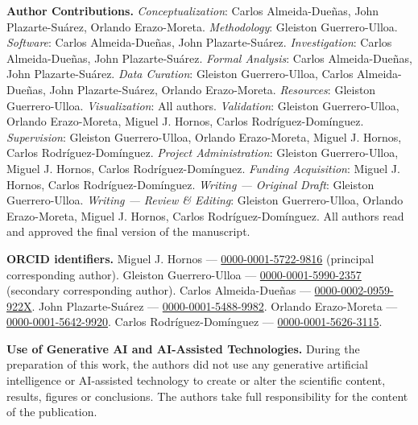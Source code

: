 \documentclass[pdflatex,sn-apa]{sn-jnl}
\begin{document}
    \textbf{Author Contributions.}
        \emph{Conceptualization}: Carlos Almeida-Due\~nas, John Plazarte-Su\'arez, Orlando Erazo-Moreta.
        \emph{Methodology}: Gleiston Guerrero-Ulloa.
        \emph{Software}: Carlos Almeida-Due\~nas, John Plazarte-Su\'arez.
        \emph{Investigation}: Carlos Almeida-Due\~nas, John Plazarte-Su\'arez.
        \emph{Formal Analysis}: Carlos Almeida-Due\~nas, John Plazarte-Su\'arez.
        \emph{Data Curation}: Gleiston Guerrero-Ulloa, Carlos Almeida-Due\~nas, John Plazarte-Su\'arez, Orlando Erazo-Moreta.
        \emph{Resources}: Gleiston Guerrero-Ulloa.
        \emph{Visualization}: All authors.
        \emph{Validation}: Gleiston Guerrero-Ulloa, Orlando Erazo-Moreta, Miguel J. Hornos, Carlos Rodr\'iguez-Dom\'inguez.
        \emph{Supervision}: Gleiston Guerrero-Ulloa, Orlando Erazo-Moreta, Miguel J. Hornos, Carlos Rodr\'iguez-Dom\'inguez.
        \emph{Project Administration}: Gleiston Guerrero-Ulloa, Miguel J. Hornos, Carlos Rodr\'iguez-Dom\'inguez.
        \emph{Funding Acquisition}: Miguel J. Hornos, Carlos Rodr\'iguez-Dom\'inguez.
        \emph{Writing --- Original Draft}: Gleiston Guerrero-Ulloa.
        \emph{Writing --- Review \& Editing}: Gleiston Guerrero-Ulloa, Orlando Erazo-Moreta, Miguel J. Hornos, Carlos Rodr\'iguez-Dom\'inguez.
        All authors read and approved the final version of the manuscript.

        \noindent \textbf{ORCID identifiers.}
            Miguel J. Hornos --- \href{https://orcid.org/0000-0001-5722-9816}{0000-0001-5722-9816} (principal corresponding author).
            Gleiston Guerrero-Ulloa --- \href{https://orcid.org/0000-0001-5990-2357}{0000-0001-5990-2357} (secondary corresponding author).
            Carlos Almeida-Due\~nas --- \href{https://orcid.org/0000-0002-0959-922X}{0000-0002-0959-922X}.
            John Plazarte-Su\'arez --- \href{https://orcid.org/0000-0001-5488-9982}{0000-0001-5488-9982}.
            Orlando Erazo-Moreta --- \href{https://orcid.org/0000-0001-5642-9920}{0000-0001-5642-9920}.
            Carlos Rodr\'iguez-Dom\'inguez --- \href{https://orcid.org/0000-0001-5626-3115}{0000-0001-5626-3115}.

    \textbf{Use of Generative AI and AI-Assisted Technologies.}
        During the preparation of this work, the authors did not use any generative artificial intelligence or AI-assisted technology to create or alter the scientific content, results, figures or conclusions. The authors take full responsibility for the content of the publication.


\begin{appendices}
    
\end{appendices}



\end{document}
